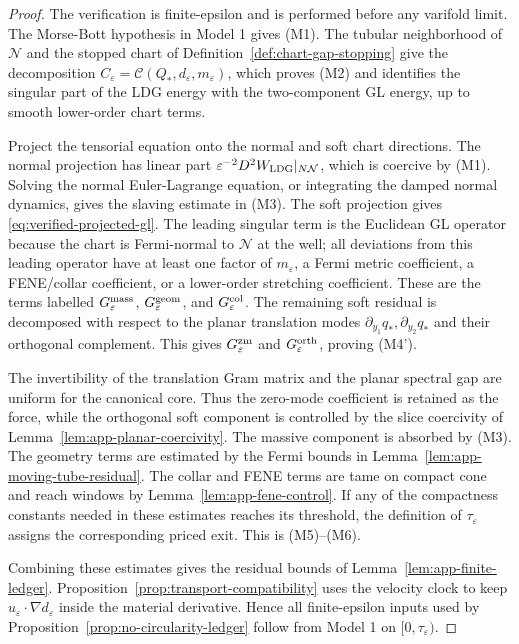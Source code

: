 \documentclass[11pt]{article}
\theoremstyle{definition}
\newcommand{\eps}{\varepsilon}
\begin{document}
\begin{proof}
The verification is finite-epsilon and is performed before any varifold limit.
The Morse-Bott hypothesis in Model 1 gives (M1).  The tubular neighborhood of
\(\mathcal N\) and the stopped chart of Definition~\ref{def:chart-gap-stopping}
give the decomposition \(C_\eps=\mathcal C(Q_\ast,d_\eps,m_\eps)\), which proves
(M2) and identifies the singular part of the LDG energy with the two-component
GL energy, up to smooth lower-order chart terms.

Project the tensorial equation onto the normal and soft chart directions.  The
normal projection has linear part \(\eps^{-2}D^2W_{\rm LDG}|_{N\mathcal N}\),
which is coercive by (M1).  Solving the normal Euler-Lagrange equation, or
integrating the damped normal dynamics, gives the slaving estimate in (M3).
The soft projection gives \eqref{eq:verified-projected-gl}.  The leading
singular term is the Euclidean GL operator because the chart is Fermi-normal to
\(\mathcal N\) at the well; all deviations from this leading operator have at
least one factor of \(m_\eps\), a Fermi metric coefficient, a FENE/collar
coefficient, or a lower-order stretching coefficient.  These are the terms
labelled \(G_\eps^{\rm mass}\), \(G_\eps^{\rm geom}\), and
\(G_\eps^{\rm col}\).  The remaining soft residual is decomposed with respect
to the planar translation modes \(\partial_{y_1}q_\ast,\partial_{y_2}q_\ast\)
and their orthogonal complement.  This gives \(G_\eps^{\rm zm}\) and
\(G_\eps^{\rm orth}\), proving (M4').

The invertibility of the translation Gram matrix and the planar spectral gap
are uniform for the canonical core.  Thus the zero-mode coefficient is retained
as the force, while the orthogonal soft component is controlled by the slice
coercivity of Lemma~\ref{lem:app-planar-coercivity}.  The massive component is
absorbed by (M3).  The geometry terms are estimated by the Fermi bounds in
Lemma~\ref{lem:app-moving-tube-residual}.  The collar and FENE terms are tame
on compact cone and reach windows by Lemma~\ref{lem:app-fene-control}.  If any
of the compactness constants needed in these estimates reaches its threshold,
the definition of \(\tau_\eps\) assigns the corresponding priced exit.  This is
(M5)--(M6).

Combining these estimates gives the residual bounds of
Lemma~\ref{lem:app-finite-ledger}.  Proposition~\ref{prop:transport-compatibility}
uses the velocity clock to keep \(u_\eps\cdot\nabla d_\eps\) inside the material
derivative.  Hence all finite-epsilon inputs used by
Proposition~\ref{prop:no-circularity-ledger} follow from Model 1 on
\([0,\tau_\eps)\).
\end{proof}
\end{document}
